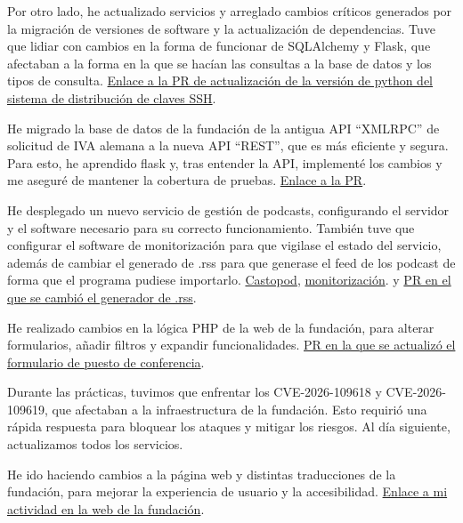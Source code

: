     Por otro lado, he actualizado servicios y arreglado cambios críticos generados por la migración de versiones de software y la actualización de dependencias.
    Tuve que lidiar con cambios en la forma de funcionar de SQLAlchemy y Flask, que afectaban a la forma en la que se hacían las consultas a la base de datos y los tipos de consulta.
    \href{https://git.fsfe.org/fsfe-system-hackers/ssh-key-distributor/pulls/45}{Enlace a la PR de actualización de la versión de python del sistema de distribución de claves SSH}.

He migrado la base de datos de la fundación de la antigua API \enquote{XMLRPC} de solicitud de IVA alemana a la nueva API \enquote{REST}, que es más eficiente y segura.
    Para esto, he aprendido flask y, tras entender la API, implementé los cambios y me aseguré de mantener la cobertura de pruebas.
\href{https://git.fsfe.org/fsfe-system-hackers/registration/pulls/11}{Enlace a la PR}.

    He desplegado un nuevo servicio de gestión de podcasts, configurando el servidor y el software necesario para su correcto funcionamiento.
También tuve que configurar el software de monitorización para que vigilase el estado del servicio,
además de cambiar el generado de .rss para que generase el feed de los podcast de forma que el programa pudiese importarlo.
\href{https://git.fsfe.org/fsfe-system-hackers/castopod}{Castopod},
\href{https://git.fsfe.org/fsfe-system-hackers/monitoring/commit/b4725cb659dba50c930aa2ff37e6c4ba638594b7}{monitorización}.
y \href{https://git.fsfe.org/FSFE/fsfe-website/pulls/6189}{PR en el que se cambió el generador de .rss}.

    He realizado cambios en la lógica PHP de la web de la fundación, para alterar formularios, añadir filtros y expandir funcionalidades.
    \href{https://git.fsfe.org/FSFE/fsfe-website/pulls/6173}{PR en la que se actualizó el formulario de puesto de conferencia}.


    Durante las prácticas, tuvimos que enfrentar los CVE-2026-109618 y CVE-2026-109619, que afectaban a la infraestructura de la fundación.
    Esto requirió una rápida respuesta para bloquear los ataques y mitigar los riesgos.
    Al día siguiente, actualizamos todos los servicios.

    He ido haciendo cambios a la página web y distintas traducciones de la fundación, para mejorar la experiencia de usuario y la accesibilidad.
    \href{https://git.fsfe.org/marcelo.fm?tab=activity}{Enlace a mi actividad en la web de la fundación}.

